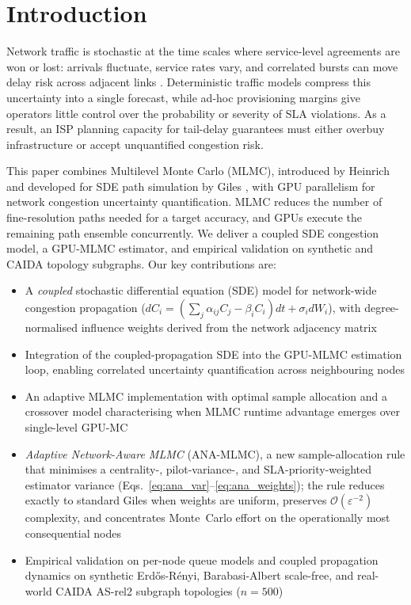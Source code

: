 \documentclass[pdflatex,sn-mathphys-num]{sn-jnl}
\theoremstyle{thmstyleone}%
\theoremstyle{thmstyletwo}%
\theoremstyle{thmstylethree}%
\begin{document}
\maketitle

\section{Introduction}

Network traffic is stochastic at the time scales where service-level agreements
are won or lost: arrivals fluctuate, service rates vary, and correlated bursts can move delay risk
across adjacent links \cite{kelly2011stochastic,whitt2002,cisco2023annual}. Deterministic traffic
models compress this uncertainty into a single forecast, while ad-hoc provisioning margins give
operators little control over the probability or severity of SLA violations. As a result, an ISP
planning capacity for tail-delay guarantees must either overbuy infrastructure or accept
unquantified congestion risk.

This paper combines Multilevel Monte Carlo (MLMC), introduced by Heinrich
\cite{heinrich2001multilevel} and developed for SDE path simulation by Giles
\cite{giles2008multilevel}, with GPU parallelism for network congestion uncertainty
quantification. MLMC reduces the number of fine-resolution paths needed for a target accuracy,
and GPUs execute the remaining path ensemble concurrently. We deliver a coupled SDE congestion
model, a GPU-MLMC estimator, and empirical validation on synthetic and CAIDA topology subgraphs.
Our key contributions are:

\begin{itemize}
    \item A \emph{coupled} stochastic differential equation (SDE) model for network-wide
    congestion propagation ($dC_i = (\sum_j \alpha_{ij}C_j - \beta_i C_i)dt + \sigma_i dW_i$),
    with degree-normalised influence weights derived from the network adjacency matrix
    \cite{kang2007,harrison1985}
    \item Integration of the coupled-propagation SDE into the GPU-MLMC estimation loop,
    enabling correlated uncertainty quantification across neighbouring nodes
    \item An adaptive MLMC implementation with optimal sample allocation and a crossover
    model characterising when MLMC runtime advantage emerges over single-level
    GPU-MC \cite{giles2015multilevel,collier2015}
    \item \emph{Adaptive Network-Aware MLMC} (ANA-MLMC), a new sample-allocation rule that
    minimises a centrality-, pilot-variance-, and SLA-priority-weighted estimator variance
    (Eqs.~\eqref{eq:ana_var}--\eqref{eq:ana_weights}); the rule reduces exactly to standard
    Giles when weights are uniform, preserves $\mathcal{O}(\varepsilon^{-2})$ complexity, and
    concentrates Monte~Carlo effort on the operationally most consequential nodes
    \item Empirical validation on per-node queue models and coupled propagation dynamics on
    synthetic Erd\H{o}s-R\'enyi, Barabasi-Albert scale-free, and real-world CAIDA AS-rel2
    subgraph topologies ($n=500$)
\end{itemize}
\end{document}
